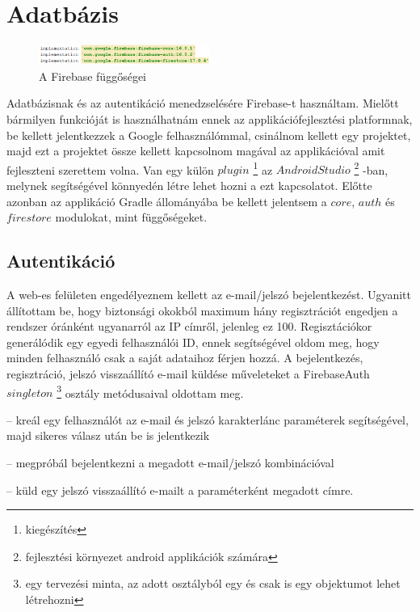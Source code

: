 \section{Adatbázis}\label{sec:ALAP:adatelem}

 \begin{figure}
	\centering
	\setlength{\abovecaptionskip}{0pt}
	\setlength{\belowcaptionskip}{0pt}
	\includegraphics[width=0.5\textwidth]{images/firebase_gradle}
	\caption{A Firebase függőségei\label{fig:ALAP:sm2}}
\end{figure}

Adatbázisnak és az autentikáció menedzselésére Firebase-t használtam. Mielőtt bármilyen funkcióját is használhatnám ennek az applikációfejlesztési platformnak, be kellett jelentkezzek a Google felhasználómmal, csinálnom kellett egy projektet, majd ezt a projektet össze kellett kapcsolnom magával az applikációval amit fejleszteni szerettem volna. Van egy külön \(plugin\)%
\footnote{ %
	kiegészítés
}  %
 az \(Android Studio\)%
 \footnote{ %
 	fejlesztési környezet android applikációk számára
 }  %
-ban, melynek segítségével könnyedén létre lehet hozni a ezt kapcsolatot. Előtte azonban az applikáció Gradle állományába be kellett jelentsem a \(core\), \(auth\) és \(firestore\) modulokat, mint függőségeket.
 

 

\subsection{Autentikáció}

A web-es felületen engedélyeznem kellett az e-mail/jelszó bejelentkezést. Ugyanitt állítottam be, hogy biztonsági okokból maximum hány regisztrációt engedjen a rendszer óránként ugyanarról az IP címről, jelenleg ez 100. Regisztációkor generálódik egy egyedi felhasználói ID, ennek segítségével oldom meg, hogy minden felhasználó csak a saját adataihoz férjen hozzá. A bejelentkezés, regisztráció, jelszó visszaállító e-mail küldése műveleteket a FirebaseAuth \(singleton\)%
\footnote{ %
	egy tervezési minta, az adott osztályból egy és csak is egy objektumot lehet létrehozni
}  %
 osztály metódusaival oldottam meg.
 
 \begin{description}
 	\setlength{\itemsep}{0.04mm}
 	\item[createUserWithEmailAndPassword(email, jelszó)] -- kreál egy felhasználót az e-mail és jelszó karakterlánc paraméterek segítségével, majd sikeres válasz után be is jelentkezik
 	\item[signInWithEmailAndPassword(email, jelszó)] -- megpróbál bejelentkezni a megadott e-mail/jelszó kombinációval
 	\item[sendPasswordResetEmail(email)] -- küld egy jelszó visszaállító e-mailt a paraméterként megadott címre.
 \end{description}

